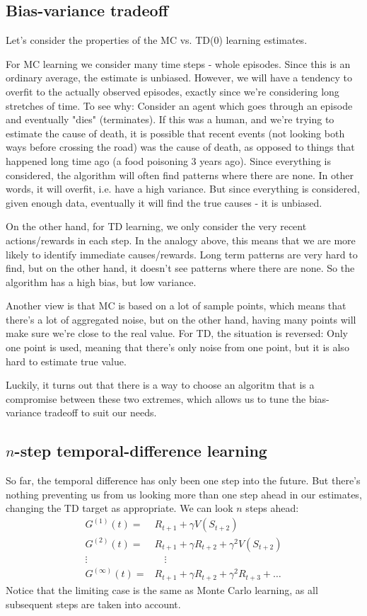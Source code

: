 \documentclass[12pt, a4paper]{article}
\numberwithin{equation}{section}
\begin{document}
\subsection{Bias-variance tradeoff}
Let's consider the properties of the MC vs. TD(0) learning estimates.

For MC learning we consider many time steps - whole episodes. Since this is an ordinary average, the estimate is unbiased. However, we will have a tendency to overfit to the actually observed episodes, exactly since we're considering long stretches of time. To see why: Consider an agent which goes through an episode and eventually "dies" (terminates). If this was a human, and we're trying to estimate the cause of death, it is possible that recent events (not looking both ways before crossing the road) was the cause of death, as opposed to things that happened long time ago (a food poisoning 3 years ago). Since everything is considered, the algorithm will often find patterns where there are none. In other words, it will overfit, i.e. have a high variance. But since everything is considered, given enough data, eventually it will find the true causes - it is unbiased.

On the other hand, for TD learning, we only consider the very recent actions/rewards in each step. In the analogy above, this means that we are more likely to identify immediate causes/rewards. Long term patterns are very hard to find, but on the other hand, it doesn't see patterns where there are none. So the algorithm has a high bias, but low variance.

Another view is that MC is based on a lot of sample points, which means that there's a lot of aggregated noise, but on the other hand, having many points will make sure we're close to the real value. For TD, the situation is reversed: Only one point is used, meaning that there's only noise from one point, but it is also hard to estimate true value.

Luckily, it turns out that there is a way to choose an algoritm that is a compromise between these two extremes, which allows us to tune the bias-variance tradeoff to suit our needs.

\subsection{$n$-step temporal-difference learning}
So far, the temporal difference has only been one step into the future. But there's nothing preventing us from us looking more than one step ahead in our estimates, changing the TD target as appropriate. We can look $n$ steps ahead:
\begin{align}
G^{(1)}(t)=&R_{t+1}+\gamma V(S_{t+2})\\
G^{(2)}(t)=&R_{t+1}+\gamma R_{t+2}+\gamma^2 V(S_{t+2})\\
\vdots\quad & \quad\vdots\\
G^{(\infty)}(t)=&R_{t+1}+\gamma R_{t+2}+\gamma^2 R_{t+3}+\dots
\end{align}
Notice that the limiting case is the same as Monte Carlo learning, as all subsequent steps are taken into account. 
\end{document}
